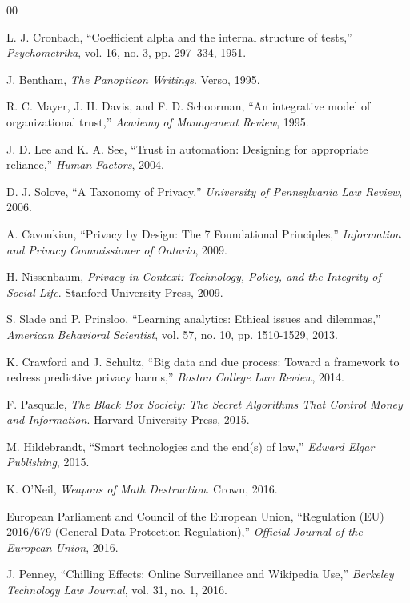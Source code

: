 \documentclass[conference]{IEEEtran}
\begin{document}
\begin{thebibliography}{00}

 L. J. Cronbach, ``Coefficient alpha and the internal structure of tests,'' \textit{Psychometrika}, vol. 16, no. 3, pp. 297--334, 1951.

 J. Bentham, \textit{The Panopticon Writings}. Verso, 1995.

 R. C. Mayer, J. H. Davis, and F. D. Schoorman, ``An integrative model of organizational trust,'' \textit{Academy of Management Review}, 1995.

 J. D. Lee and K. A. See, ``Trust in automation: Designing for appropriate reliance,'' \textit{Human Factors}, 2004.

 D. J. Solove, ``A Taxonomy of Privacy,'' \textit{University of Pennsylvania Law Review}, 2006.

 A. Cavoukian, ``Privacy by Design: The 7 Foundational Principles,'' \textit{Information and Privacy Commissioner of Ontario}, 2009.

 H. Nissenbaum, \textit{Privacy in Context: Technology, Policy, and the Integrity of Social Life}. Stanford University Press, 2009.

 S. Slade and P. Prinsloo, ``Learning analytics: Ethical issues and dilemmas,'' \textit{American Behavioral Scientist}, vol. 57, no. 10, pp. 1510-1529, 2013.

 K. Crawford and J. Schultz, ``Big data and due process: Toward a framework to redress predictive privacy harms,'' \textit{Boston College Law Review}, 2014.

 F. Pasquale, \textit{The Black Box Society: The Secret Algorithms That Control Money and Information}. Harvard University Press, 2015.

 M. Hildebrandt, ``Smart technologies and the end(s) of law,'' \textit{Edward Elgar Publishing}, 2015.


 K. O'Neil, \textit{Weapons of Math Destruction}. Crown, 2016.

 European Parliament and Council of the European Union, ``Regulation (EU) 2016/679 (General Data Protection Regulation),'' \textit{Official Journal of the European Union}, 2016.

 J. Penney, ``Chilling Effects: Online Surveillance and Wikipedia Use,'' \textit{Berkeley Technology Law Journal}, vol. 31, no. 1, 2016.


\end{thebibliography}
\end{document}
